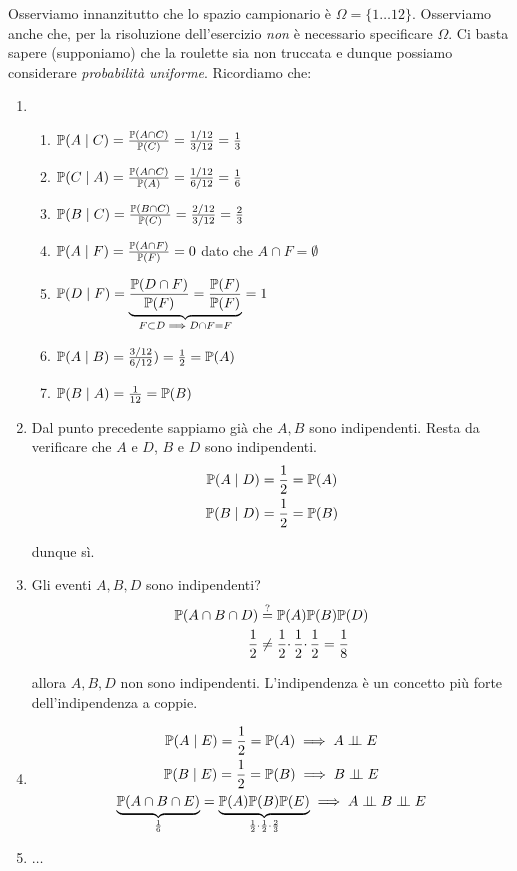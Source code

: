 Osserviamo innanzitutto che lo spazio campionario è $\Omega =\{1\dots 12\}$. Osserviamo anche che, per la risoluzione dell'esercizio \textit{non} è necessario specificare $\Omega $. Ci basta sapere (supponiamo) che la roulette sia non truccata e dunque possiamo considerare \textit{probabilità uniforme}. Ricordiamo che:
\begin{enumerate}
\item 
\begin{enumerate}
\item $\mathbb{P}( A\mid C) =\frac{\mathbb{P}( A\cap C)}{\mathbb{P}( C)} =\frac{1/12}{3/12} =\frac{1}{3}$
\item $\mathbb{P}( C\mid A) =\frac{\mathbb{P}( A\cap C)}{\mathbb{P}( A)} =\frac{1/12}{6/12} =\frac{1}{6}$
\item $\mathbb{P}( B\mid C) =\frac{\mathbb{P}( B\cap C)}{\mathbb{P}( C)} =\frac{2/12}{3/12} =\frac{2}{3}$
\item $\mathbb{P}( A\mid F) =\frac{\mathbb{P}( A\cap F)}{\mathbb{P}( F)} =0$ dato che $A\cap F=\emptyset $
\item $\mathbb{P}( D\mid F) =\underbrace{\frac{\mathbb{P}( D\cap F)}{\mathbb{P}( F)} =\frac{\mathbb{P}( F)}{\mathbb{P}( F)}}_{F\subset D\implies D\cap F=F} =1$
\item $\mathbb{P}( A\mid B) =\frac{3/12}{6/12}) =\frac{1}{2} =\mathbb{P}( A)$
\item $\mathbb{P}( B\mid A) =\frac{1}{12} =\mathbb{P}( B)$
\end{enumerate}
\item Dal punto precedente sappiamo già che $A,B$ sono indipendenti. Resta da verificare che $A$ e $D$, $B$ e $D$ sono indipendenti.\begin{gather*}
\mathbb{P}( A\mid D) =\frac{1}{2} =\mathbb{P}( A)\\
\mathbb{P}( B\mid D) =\frac{1}{2} =\mathbb{P}( B)
\end{gather*}

dunque sì.
\item Gli eventi $A,B,D$ sono indipendenti?\begin{equation*}
\begin{aligned}
\mathbb{P}( A\cap B\cap D) & \overset{?}{=} \mathbb{P}( A)\mathbb{P}( B)\mathbb{P}( D)\\
\frac{1}{2} & \neq \frac{1}{2} \cdotp \frac{1}{2} \cdotp \frac{1}{2} =\frac{1}{8}
\end{aligned}
\end{equation*}

allora $A,B,D$ non sono indipendenti. L'indipendenza è un concetto più forte dell'indipendenza a coppie.
\item \begin{gather*}
\PP( A\mid E) =\frac{1}{2} =\PP( A) \implies A\Bot E\\
\PP( B\mid E) =\frac{1}{2} =\PP( B) \implies B\Bot E\\
\underbrace{\PP( A\cap B\cap E)}_{\frac{1}{6}} =\underbrace{\PP( A)\PP( B)\PP( E)}_{\frac{1}{2} \cdotp \frac{1}{2} \cdotp \frac{2}{3}} \implies A\Bot B\Bot E
\end{gather*}
\item $\dots $
\end{enumerate}
\Soluzione

